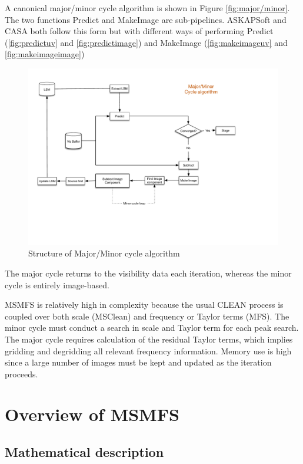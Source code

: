 \documentclass[11pt,a4paper]{article}
\begin{document}
A canonical major/minor cycle algorithm is shown in Figure \ref{fig:major/minor}. The two functions Predict and MakeImage are sub-pipelines. ASKAPSoft and CASA both follow this form but with different ways of performing Predict (\ref{fig:predictuv} and \ref{fig:predictimage}) and MakeImage (\ref{fig:makeimageuv} and \ref{fig:makeimageimage})

\begin{figure}[htb]
  \centering
  \includegraphics[width=\textwidth]{./MSMFS_MajorMinor.pdf}
  \caption{Structure of Major/Minor cycle algorithm}
  \label{fig:majorminor}
\end{figure}

The major cycle returns to the visibility data each iteration, whereas the minor cycle is entirely image-based.

MSMFS is relatively high in complexity because the usual CLEAN process is coupled over both scale (MSClean) and frequency or Taylor terms (MFS). The minor cycle must conduct a search in scale and Taylor term for each peak search. The major cycle requires calculation of the residual Taylor terms, which implies gridding and degridding all relevant frequency information. Memory use is high since a large number of images must be kept and updated as the iteration proceeds.



\clearpage
\section{Overview of MSMFS}
\label{sec:overview}

\subsection{Mathematical description}
\end{document}
